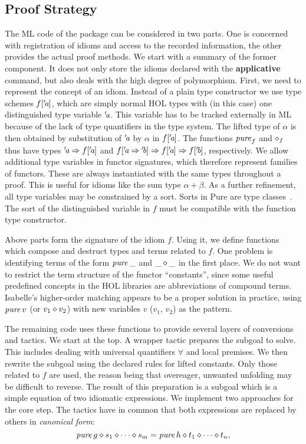 \subsection{Proof Strategy}\label{subsec:proof-strategy}

The ML code of the package can be considered in two parts.
One is concerned with registration of idioms and access to the recorded
information, the other provides the actual proof methods.
We start with a summary of the former component.
It does not only store the idioms declared with the \textbf{applicative}
command, but also deals with the high degree of polymorphism.
First, we need to represent the concept of an idiom.
Instead of a plain type constructor we use type schemes $f[{'\!\textit{a}}]$, which
are simply normal HOL types with (in this case) one distinguished type variable
${'\!\textit{a}}$.
This variable has to be tracked externally in ML because of the lack of
type quantifiers in the type system.
The lifted type of $\alpha$ is then obtained by substitution of ${'\!\textit{a}}$ by
$\alpha$ in $f[{'\!\textit{a}}]$.
The functions $\operatorname{\mathit{pure}}_f$ and $\diamond_f$ thus have types
${'\!\textit{a}} \Rightarrow f[{'\!\textit{a}}]$ and $f[{'\!\textit{a}} \Rightarrow {'\!\textit{b}}] \Rightarrow f[{'\!\textit{a}}] \Rightarrow f[{'\!\textit{b}}]$,
respectively.
We allow additional type variables in functor signatures, which therefore
represent families of functors.
These are always instantiated with the same types throughout a proof.
This is useful for idioms like the sum type $\alpha + \beta$.
As a further refinement, all type variables may be constrained by a sort.
Sorts in Pure are type classes~\cite{implementation-ref}.
The sort of the distinguished variable in $f$ must be compatible with the
function type constructor.

Above parts form the signature of the idiom $f$.
Using it, we define functions which compose and destruct types and terms
related to $f$.
One problem is identifying terms of the form $\operatorname{\mathit{pure}} \_$ and $\_ \diamond \_$ in
the first place.
We do not want to restrict the term structure of the functor ``constants'',
since some useful predefined concepts in the HOL libraries are abbreviations of
compound terms.
Isabelle's higher-order matching appears to be a proper solution in practice,
using $\operatorname{\mathit{pure}} v$ (or $v_1 \diamond v_2$) with new variables $v$ ($v_1$, $v_2$) as the
pattern.

The remaining code uses these functions to provide several layers of
conversions and tactics.
We start at the top.
A wrapper tactic prepares the subgoal to solve.
This includes dealing with universal quantifiers $\forall$ and local premises.
We then rewrite the subgoal using the declared rules for lifted constants.
Only those related to $f$ are used, the reason being that overeager, unwanted
unfolding may be difficult to reverse.
The result of this preparation is a subgoal which is a simple equation of two
idiomatic expressions.
We implement two approaches for the core step.
The tactics have in common that both expressions are replaced by others in
\emph{canonical form}:
\[ \operatorname{\mathit{pure}}{g} \diamond s_1 \diamond \cdots \diamond s_m = \operatorname{\mathit{pure}}{h} \diamond t_1 \diamond \cdots \diamond t_n, \]

